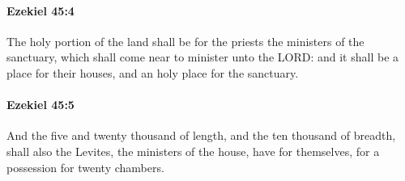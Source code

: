 		\paragraph{Ezekiel 45:4} %
			\label{EZEKIEL-45-4}

			The holy portion of the land shall be for the priests the ministers of the sanctuary, which shall come near to minister unto the LORD: and it shall be a place for their houses, and an holy place for the sanctuary.


		\paragraph{Ezekiel 45:5} %
			\label{EZEKIEL-45-5}

			And the five and twenty thousand of length, and the ten thousand of breadth, shall also the Levites, the ministers of the house, have for themselves, for a possession for twenty chambers.

